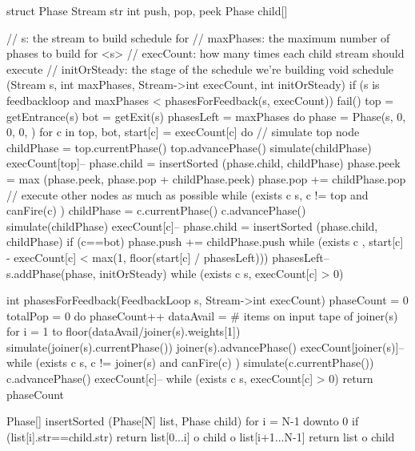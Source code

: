 struct Phase {
  Stream str
  int push, pop, peek
  Phase child[]
}

// s: the stream to build schedule for
// maxPhases:  the maximum number of phases to build for <s>
// execCount:  how many times each child stream should execute
// initOrSteady:  the stage of the schedule we're building
void schedule (Stream s, int maxPhases, Stream->int execCount, int initOrSteady) {
  if (s is feedbackloop and maxPhases < phasesForFeedback(s, execCount))
    fail()
  top = getEntrance(s)
  bot = getExit(s)
  phasesLeft = maxPhases
  do {
    phase = Phase(s, 0, 0, 0, {})
    for c in {top, bot}, start[c] = execCount[c]
    do {
      // simulate top node
      childPhase = top.currentPhase()
      top.advancePhase()
      simulate(childPhase)
      execCount[top]--
      phase.child = insertSorted (phase.child, childPhase)
      phase.peek = max (phase.peek, phase.pop + childPhase.peek)
      phase.pop += childPhase.pop
      // execute other nodes as much as possible
      while (exists c \in s, c != top and canFire(c) ) {
        childPhase = c.currentPhase()
        c.advancePhase()
        simulate(childPhase)
        execCount[c]--
        phase.child = insertSorted (phase.child, childPhase)
        if (c==bot)
          phase.push += childPhase.push
      }
    } while (exists c , start[c] - execCount[c] < max(1, floor(start[c] / phasesLeft)))
    phasesLeft--
    s.addPhase(phase, initOrSteady)
  } while (exists c \in s, execCount[c] > 0)
}

int phasesForFeedback(FeedbackLoop s, Stream->int execCount) {
  phaseCount = 0
  totalPop = 0
  do {
    phaseCount++
    dataAvail = # items on input tape of joiner(s)
    for i = 1 to floor(dataAvail/joiner(s).weights[1]) {
      simulate(joiner(s).currentPhase())
      joiner(s).advancePhase()
      execCount[joiner(s)]--
    }
    while (exists c \in s, c != joiner(s) and canFire(c) ) {
      simulate(c.currentPhase())
      c.advancePhase()
      execCount[c]--
    }
  } while (exists c \in s, execCount[c] > 0)
  return phaseCount
}

Phase[] insertSorted (Phase[N] list, Phase child) {
  for i = N-1 downto 0
    if (list[i].str==child.str)
      return list[0...i] o child o list[i+1...N-1]
  return list o child
}
